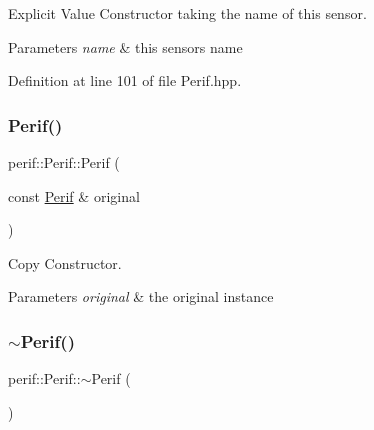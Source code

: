 Explicit Value Constructor taking the name of this sensor.


\begin{DoxyParams}{Parameters}
{\em name} & this sensor\textquotesingle{}s name \\
\hline
\end{DoxyParams}


Definition at line 101 of file Perif.\+hpp.


\begin{DoxyCode}{0}

\end{DoxyCode}
\mbox{\label{classperif_1_1Perif_a21a0ae2afadf66cffa487b4a033598d4}} 
\subsubsection{\texorpdfstring{Perif()}{Perif()}\hspace{0.1cm}{\footnotesize\ttfamily [2/2]}}
{\footnotesize\ttfamily perif\+::\+Perif\+::\+Perif (\begin{DoxyParamCaption}\item[{const \mbox{\hyperlink{classperif_1_1Perif}{Perif}} \&}]{original }\end{DoxyParamCaption})\hspace{0.3cm}{\ttfamily [default]}}

Copy Constructor.


\begin{DoxyParams}{Parameters}
{\em original} & the original instance \\
\hline
\end{DoxyParams}
\mbox{\label{classperif_1_1Perif_a9b09771466ddb178c694eec670089fe1}} 
\subsubsection{\texorpdfstring{$\sim$Perif()}{~Perif()}}
{\footnotesize\ttfamily perif\+::\+Perif\+::$\sim$\+Perif (\begin{DoxyParamCaption}{ }\end{DoxyParamCaption})\hspace{0.3cm}{\ttfamily [default]}}


